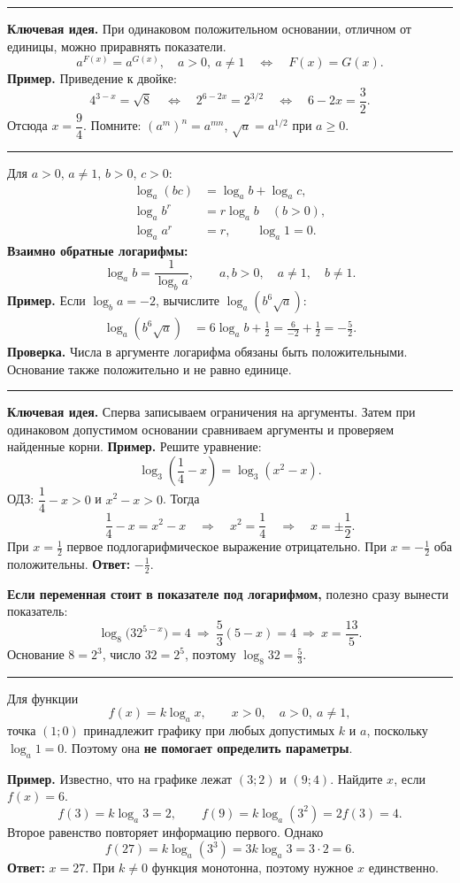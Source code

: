 \documentclass[a4paper,12pt]{article}
\newcommand{\sect}[2]{%
  \Needspace{7\baselineskip}%
  \vspace{6pt}\noindent{\large\textcolor{darkaccent}{#1.\enspace #2}}\par\vspace{-1pt}%
  {\color{accent}\rule{\linewidth}{0.45pt}}\par\vspace{5pt}}
\newcommand{\idea}[1]{\textcolor{darkaccent}{\textbf{Ключевая идея.}} #1}
\newcommand{\warn}[1]{\textcolor{darkaccent}{\textbf{Проверка.}} #1}
\newcommand{\ex}[1]{\textcolor{darkaccent}{\textbf{Пример.}} #1}
\begin{document}
\sect{2}{Показательные уравнения}
\idea{При одинаковом положительном основании, отличном от единицы, можно приравнять показатели.}
\[
 a^{F(x)}=a^{G(x)},\quad a>0,\ a\ne1
 \quad\Longleftrightarrow\quad F(x)=G(x).
\]
\ex{Приведение к двойке:}
\[
 4^{3-x}=\sqrt{8}
 \quad\Longleftrightarrow\quad
 2^{6-2x}=2^{3/2}
 \quad\Longleftrightarrow\quad
 6-2x=\frac32.
\]
Отсюда $x=\dfrac94$. Помните: $(a^m)^n=a^{mn}$, $\sqrt a=a^{1/2}$ при $a\ge0$.

\sect{3}{Свойства логарифмов и перемена основания}
Для $a>0$, $a\ne1$, $b>0$, $c>0$:
\[
\begin{aligned}
\log_a(bc)&=\log_a b+\log_a c,\\
\log_a b^r&=r\log_a b\quad(b>0),\\
\log_a a^r&=r,\qquad \log_a1=0.
\end{aligned}
\]
\textbf{Взаимно обратные логарифмы:}
\[
 \log_a b=\frac{1}{\log_b a},\qquad a,b>0,\quad a\ne1,\quad b\ne1.
\]
\ex{Если $\log_b a=-2$, вычислите $\log_a(b^6\sqrt a)$:}
\[
\begin{aligned}
\log_a(b^6\sqrt a)&=6\log_a b+\tfrac12
 =\frac{6}{-2}+\frac12=\boxed{-\frac52}.
\end{aligned}
\]
\warn{Числа в аргументе логарифма обязаны быть положительными. Основание также положительно и не равно единице.}

\sect{4}{Логарифмические уравнения}
\idea{Сперва записываем ограничения на аргументы. Затем при одинаковом допустимом основании сравниваем аргументы и проверяем найденные корни.}
\ex{Решите уравнение:}
\[
 \log_3\left(\frac14-x\right)=\log_3(x^2-x).
\]
ОДЗ: $\dfrac14-x>0$ и $x^2-x>0$. Тогда
\[
 \frac14-x=x^2-x\quad\Longrightarrow\quad
 x^2=\frac14\quad\Longrightarrow\quad x=\pm\frac12.
\]
При $x=\tfrac12$ первое подлогарифмическое выражение отрицательно. При $x=-\tfrac12$ оба положительны. \textbf{Ответ:} $\boxed{-\tfrac12}$.

\textbf{Если переменная стоит в показателе под логарифмом,} полезно сразу вынести показатель:
\[
 \log_8\bigl(32^{5-x}\bigr)=4
 \ \Longrightarrow\ \frac53(5-x)=4
 \ \Longrightarrow\ \boxed{x=\frac{13}{5}}.
\]
Основание $8=2^3$, число $32=2^5$, поэтому $\log_8 32=\frac53$.

\clearpage
\sect{5}{Логарифмические графики: какие точки полезны}
Для функции
\[
 f(x)=k\log_a x,\qquad x>0,\quad a>0,\ a\ne1,
\]
точка $(1;0)$ принадлежит графику при любых допустимых $k$ и $a$, поскольку $\log_a1=0$. Поэтому она \textbf{не помогает определить параметры}.

\ex{Известно, что на графике лежат $(3;2)$ и $(9;4)$. Найдите $x$, если $f(x)=6$.}
\[
 f(3)=k\log_a3=2,
 \qquad f(9)=k\log_a(3^2)=2f(3)=4.
\]
Второе равенство повторяет информацию первого. Однако
\[
 f(27)=k\log_a(3^3)=3k\log_a3=3\cdot2=6.
\]
\textbf{Ответ:} $\boxed{x=27}$. При $k\ne0$ функция монотонна, поэтому нужное $x$ единственно.
\end{document}
